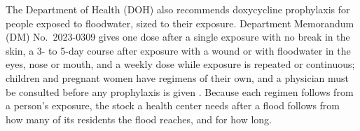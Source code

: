 The Department of Health (DOH) also recommends doxycycline prophylaxis for people exposed to
floodwater, sized to their exposure. Department Memorandum (DM) No.~\mbox{2023-0309} gives one dose after a
single exposure with no break in the skin, a 3- to 5-day course after exposure with a wound or
with floodwater in the eyes, nose or mouth, and a weekly dose while exposure is repeated or
continuous; children and pregnant women have regimens of their own, and a physician must be
consulted before any prophylaxis is given \parencite{doh2023}. Because each regimen follows
from a person's exposure, the stock a health center needs after a flood follows from how many
of its residents the flood reaches, and for how long.

